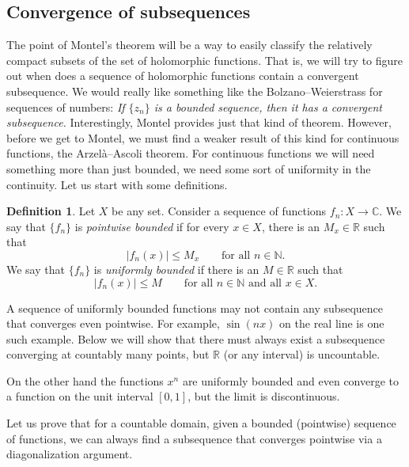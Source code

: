 \documentclass[12pt,openany]{book}
\newcommand{\sabs}[1]{\lvert {#1} \rvert}
\newcommand{\C}{{\mathbb{C}}}
\newcommand{\R}{{\mathbb{R}}}
\newcommand{\N}{{\mathbb{N}}}
\newcommand{\myindex}[1]{#1\index{#1}}
\theoremstyle{plain}
\theoremstyle{remark}
\theoremstyle{definition}
\newtheorem{defn}[thm]{Definition}
\theoremstyle{exercise}
\theoremstyle{example}
\begin{document}
\subsection{Convergence of subsequences}

The point of Montel's theorem will be a way to easily classify the
relatively compact subsets of the set of holomorphic functions.  That is,
we will try to figure out when does a sequence of holomorphic functions
contain a convergent subsequence.  We would really like something like the
Bolzano--Weierstrass for sequences of numbers:  \emph{If $\{ z_n \}$ is a
bounded sequence, then it has a convergent subsequence.}
Interestingly, Montel provides just that kind of theorem.
However, before we get to Montel, we must find a weaker result
of this kind for continuous functions, the Arzel\`a--Ascoli theorem.
For continuous functions we will need something more than just bounded,
we need some sort of uniformity in the continuity.
Let us start with some definitions.

\begin{defn}
Let $X$ be any set.
Consider a sequence of functions $f_n \colon X \to \C$.  We say that
$\{ f_n \}$
is \emph{\myindex{pointwise bounded}} if for every $x \in X$, there is an $M_x \in \R$
such that
\begin{equation*}
\sabs{f_n(x)} \leq M_x \qquad \text{for all } n \in \N .
\end{equation*}
We say that
$\{ f_n \}$
is \emph{\myindex{uniformly bounded}} if there is an $M \in \R$
such that
\begin{equation*}
\sabs{f_n(x)} \leq M \qquad \text{for all } n \in \N \text{ and all } x \in X.
\end{equation*}
\end{defn}

A sequence of uniformly bounded functions may
not contain any subsequence that converges even pointwise.
For example, $\sin(nx)$ on the real line is one such example.
Below we will show that there must always exist
a subsequence converging at countably
many points, but $\R$ (or any interval) is uncountable.

On the other hand the functions $x^n$ are uniformly bounded
and even converge to a function on the unit interval $[0,1]$, but the limit
is discontinuous.

Let us prove that for a countable domain, given a bounded (pointwise)
sequence of functions, we can always find a subsequence
that converges pointwise via a diagonalization argument.
\end{document}
